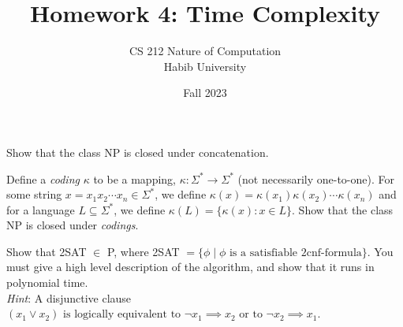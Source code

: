 \documentclass[addpoints,a4paper]{exam}
\title{Homework 4: Time Complexity}
\author{CS 212 Nature of Computation\\Habib University}
\date{Fall 2023}
\begin{document}
\maketitle

\begin{questions}
  

\question[25]


\question[25] Show that the class NP is closed under concatenation.

\question[25] Define a \textit{coding} $\kappa$ to be a mapping,  $\kappa:\Sigma^*\rightarrow \Sigma^*$ (not necessarily one-to-one). For some string $x = x_1x_2\cdots x_n\in\Sigma^*$, we define $\kappa(x) = \kappa(x_1)\kappa(x_2)\cdots\kappa(x_n)$ and for a language $L\subseteq \Sigma^*$, we define $\kappa(L) = \{\kappa(x): x\in L \}$. Show that the class NP is closed under \textit{codings}. 


\question[25] Show that 2SAT $\in$  P, where 2SAT $ = \{ \phi \mid \phi \text{ is a satisfiable 2cnf-formula}\}$. You must give a high level description of the algorithm, and show that it runs in polynomial time. \\ \textit{Hint}: A disjunctive clause $(x_1 \vee x_2) \text{ is logically equivalent to } \neg x_1 \implies x_2 \text{ or to } \neg x_2 \implies x_1$.

\end{questions}
\end{document}
